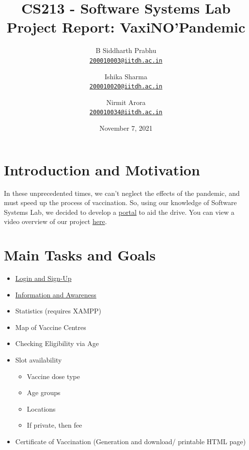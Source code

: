 \documentclass{article}
\title{\textbf{
CS213 - Software Systems Lab \\ 
Project Report: VaxiNO'Pandemic
}}
\author{
  B Siddharth Prabhu\\
  \href{mailto:200010003@iitdh.ac.in}{\texttt{200010003@iitdh.ac.in}}
  \and
  Ishika Sharma\\
  \href{mailto:200010020@iitdh.ac.in}{\texttt{200010020@iitdh.ac.in}}
  \and
  Nirmit Arora\\
  \href{mailto:200010034@iitdh.ac.in}{\texttt{200010034@iitdh.ac.in}}
}
\date{November 7, 2021}
\begin{document}
\maketitle

\section{Introduction and Motivation}
In these unprecedented times, we can't neglect the effects of the pandemic, and must speed up the process of vaccination. So, using our knowledge of Software Systems Lab, we decided to develop a {\color{blue}\href{https://whitelisted2.github.io/VaxiNO-Pandemic/}{portal}} to aid the drive. You can view a video overview of our project  {\color{blue}\href{https://youtu.be/0gNqwNLtwm4}{here}}.

\section{Main Tasks and Goals}
\begin{itemize}
    \item {\color{blue}\href{https://whitelisted2.github.io/VaxiNO-Pandemic/user_login_signup.html}{Login and Sign-Up}}
    \item {\color{blue}\href{https://whitelisted2.github.io/VaxiNO-Pandemic/awareness.html}{Information and Awareness}}
    \item Statistics (requires XAMPP) %
    \item Map of Vaccine Centres
    \item Checking Eligibility via Age
    \item Slot availability %
    \begin{itemize}
        \item Vaccine dose type
        \item Age groups
        \item Locations
        \item If private, then fee
    \end{itemize}
    \item Certificate of Vaccination (Generation and download/ printable HTML page)
\end{itemize}
\end{document}

